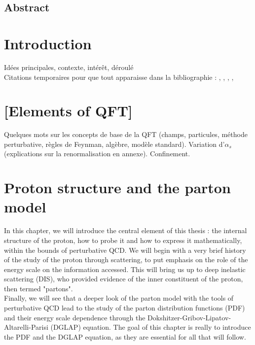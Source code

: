\documentclass[a4paper,10pt]{report}
\begin{document}
\section*{Abstract}

\newpage

\chapter*{Introduction}
Idées principales, contexte, intérêt, déroulé\\

Citations temporaires pour que tout apparaisse dans la bibliographie : 
\cite{Hautmann_2018}, \cite{hj_lect}, \cite{Lelek}, \cite{cours1}, \cite{Ellis_Stirling_Webber_1996}

\newpage

\chapter{[Elements of QFT]}
Quelques mots sur les concepts de base de la QFT (champs, particules, méthode perturbative, règles de Feynman, algèbre, modèle standard).
Variation d'$\alpha_s$ (explications sur la renormalisation en annexe).
Confinement.

\newpage

\chapter{Proton structure and the parton model}

In this chapter, we will introduce the central element of this thesis : the internal structure 
of the proton, how to probe it and how to express it mathematically, within the bounds of perturbative QCD. 
We will begin with a very brief history of the study of the proton through scattering, to put emphasis on 
the role of the energy scale on the information accessed. This will bring us up to deep inelastic scattering 
(DIS), who provided evidence of the inner constituent of the proton, then termed "partons". \\
Finally, we will see that a deeper look of the parton model with the tools of perturbative QCD 
lead to the study of the parton distribution functions (PDF) and their energy scale dependence 
through the Dokshitzer-Gribov-Lipatov-Altarelli-Parisi (DGLAP) equation. The goal of this chapter is really 
to introduce the PDF and the DGLAP equation, as they are essential for all that will follow.\\
\end{document}
